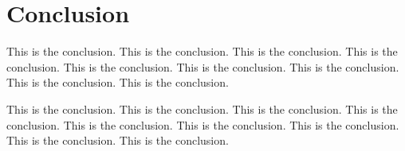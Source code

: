 \chapter{Conclusion}

This is the conclusion.  This is the conclusion.  This is the conclusion.
This is the conclusion.  This is the conclusion.  This is the conclusion.
This is the conclusion.  This is the conclusion.  This is the conclusion.

This is the conclusion.  This is the conclusion.  This is the conclusion.
This is the conclusion.  This is the conclusion.  This is the conclusion.
This is the conclusion.  This is the conclusion.  This is the conclusion.
